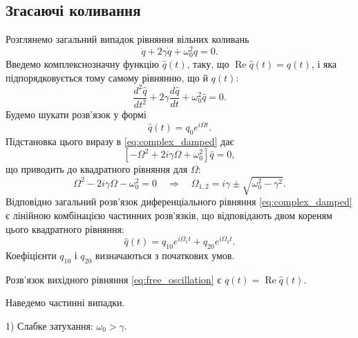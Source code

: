 \subsection*{Згасаючі коливання}

Розглянемо загальний випадок рівняння вільних коливань
\begin{equation}\label{eq:damped_equation}
	\ddot{q} + 2\gamma\dot{q} + \omega_0^2 q = 0.
\end{equation}
Введемо комплекснозначну функцію $\hat{q}(t)$, таку, що $\operatorname{Re}\hat{q}(t) = q(t)$, і
яка підпорядковується тому самому рівнянню, що й $q(t)$:
\begin{equation}\label{eq:complex_damped}
	\frac{d^2\hat{q}}{dt^2} + 2\gamma\frac{d\hat{q}}{dt} + \omega_0^2\hat{q} = 0.
\end{equation}
Будемо шукати розв'язок у формі
\begin{equation}\label{eq:complex_ansatz}
	\hat{q}(t) = q_0 e^{i\Omega t}.
\end{equation}
Підстановка цього виразу в \eqref{eq:complex_damped} дає
\begin{equation}\label{eq:characteristic}
	\left[-\Omega^2 + 2i\gamma\Omega + \omega_0^2\right]\hat{q} = 0,
\end{equation}
що приводить до квадратного рівняння для $\Omega$:
\begin{equation}\label{eq:Omega_roots}
	\Omega^2 - 2i\gamma\Omega - \omega_0^2 = 0
	\quad\Rightarrow\quad
	\Omega_{1,2} = i\gamma \pm \sqrt{\omega_0^2 - \gamma^2}.
\end{equation}
Відповідно загальний розв'язок диференціального рівняння \eqref{eq:complex_damped}
є лінійною комбінацією частинних розв'язків, що відповідають двом кореням
цього квадратного рівняння:
\begin{equation}\label{eq:general_solution}
	\hat{q}(t) = q_{10} e^{i\Omega_1 t} + q_{20} e^{i\Omega_2 t}.
\end{equation}
Коефіцієнти $q_{10}$ і $q_{20}$ визначаються з початкових умов.

Розв'язок вихідного рівняння \eqref{eq:free_oscillation} є $q(t) = \operatorname{Re}\hat{q}(t)$.

Наведемо частинні випадки.

1) Слабке затухання: $\omega_0 > \gamma$.

